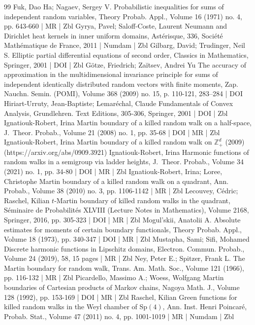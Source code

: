 \documentclass[10pt]{amsart}
\theoremstyle{definition}\newtheorem{defi}[theo]{Definition}\newtheorem{rema}[theo]{Remark}\newtheorem{exam}[theo]{Example}\newtheorem{exem}[theo]{Example}\newtheorem{nota}[theo]{Notation}
\begin{document}
\begin{thebibliography}{99}
Fuk, Dao Ha; Nagaev, Sergey V. Probabilistic inequalities for sums of independent random variables, Theory Probab. Appl., Volume 16 (1971) no. 4, pp. 643-660 | MR | Zbl
Gyrya, Pavel; Saloff-Coste, Laurent Neumann and Dirichlet heat kernels in inner uniform domains, Astérisque, 336, Société Mathématique de France, 2011 | Numdam | Zbl
Gilbarg, David; Trudinger, Neil S. Elliptic partial differential equations of second order, Classics in Mathematics, Springer, 2001 | DOI | Zbl
Götze, Friedrich; Zaĭtsev, Andrei Yu The accuracy of approximation in the multidimensional invariance principle for sums of independent identically distributed random vectors with finite moments, Zap. Nauchn. Semin. (POMI), Volume 368 (2009) no. 15, p. 110-121, 283–284 | DOI
Hiriart-Urruty, Jean-Baptiste; Lemaréchal, Claude Fundamentals of Convex Analysis, Grundlehren. Text Editions, 305-306, Springer, 2001 | DOI | Zbl
Ignatiouk-Robert, Irina Martin boundary of a killed random walk on a half-space, J. Theor. Probab., Volume 21 (2008) no. 1, pp. 35-68 | DOI | MR | Zbl
Ignatiouk-Robert, Irina Martin boundary of a killed random walk on $\mathbb{Z}_+^d$ (2009) (https://arxiv.org/abs/0909.3921)
Ignatiouk-Robert, Irina Harmonic functions of random walks in a semigroup via ladder heights, J. Theor. Probab., Volume 34 (2021) no. 1, pp. 34-80 | DOI | MR | Zbl
Ignatiouk-Robert, Irina; Loree, Christophe Martin boundary of a killed random walk on a quadrant, Ann. Probab., Volume 38 (2010) no. 3, pp. 1106-1142 | MR | Zbl
Lecouvey, Cédric; Raschel, Kilian $t$-Martin boundary of killed random walks in the quadrant, Séminaire de Probabilités XLVIII (Lecture Notes in Mathematics), Volume 2168, Springer, 2016, pp. 305-323 | DOI | MR | Zbl
Mogul’skii, Anatolii A. Absolute estimates for moments of certain boundary functionals, Theory Probab. Appl., Volume 18 (1973), pp. 340-347 | DOI | MR | Zbl
Mustapha, Sami; Sifi, Mohamed Discrete harmonic functions in Lipschitz domains, Electron. Commun. Probab., Volume 24 (2019), 58, 15 pages | MR | Zbl
Ney, Peter E.; Spitzer, Frank L. The Martin boundary for random walk, Trans. Am. Math. Soc., Volume 121 (1966), pp. 116-132 | MR | Zbl
Picardello, Massimo A.; Woess, Wolfgang Martin boundaries of Cartesian products of Markov chains, Nagoya Math. J., Volume 128 (1992), pp. 153-169 | DOI | MR | Zbl
Raschel, Kilian Green functions for killed random walks in the Weyl chamber of Sp$(4)$, Ann. Inst. Henri Poincaré, Probab. Stat., Volume 47 (2011) no. 4, pp. 1001-1019 | MR | Numdam | Zbl

\end{thebibliography}
\end{document}
